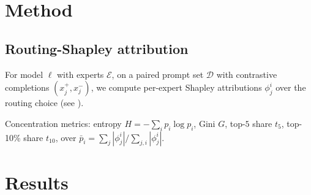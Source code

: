 \documentclass[sigconf]{acmart}
\begin{document}
\section{Method}
\subsection{Routing-Shapley attribution}
For model $\ell$ with experts $\mathcal{E}$, on a paired prompt set
$\mathcal{D}$ with contrastive completions $(x^+_j, x^-_j)$, we compute
per-expert Shapley attributions $\phi_j^i$ over the routing choice (see
\cite{DBLP:journals/corr/abs-1705-07874}).

Concentration metrics: entropy $H = -\sum_i p_i \log p_i$,
Gini $G$, top-$5$ share $t_5$, top-10\% share $t_{10}$, over
$\bar{p}_i = \sum_j |\phi_j^i| / \sum_{j,i}|\phi_j^i|$.

\section{Results}
\end{document}
